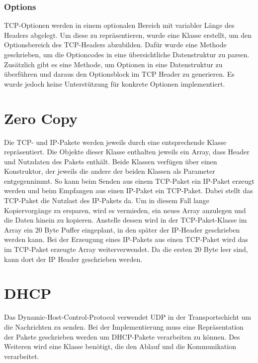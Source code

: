 \subsubsection{Options}
TCP-Optionen werden in einem optionalen Bereich mit variabler Länge des Headers abgelegt. Um diese zu repräsentieren, wurde eine Klasse erstellt, um den Optionsbereich des TCP-Headers abzubilden. Dafür wurde eine Methode geschrieben, um die Optioncodes in eine übersichtliche Datenstruktur zu parsen. Zusätzlich gibt es eine Methode, um Optionen in eine Datenstruktur zu überführen und daraus den Optionsblock im TCP Header zu generieren. Es wurde jedoch keine Unterstützung für konkrete Optionen implementiert.



\section{Zero Copy}
Die TCP- und IP-Pakete werden jeweils durch eine entsprechende Klasse repräsentiert. Die Objekte dieser Klasse enthalten jeweils ein Array, dass Header und Nutzdaten des Pakets enthält. Beide Klassen verfügen über einen Konstruktor, der jeweils die andere der beiden Klassen als Parameter entgegennimmt. So kann beim Senden aus einem TCP-Paket ein IP-Paket erzeugt werden und beim Empfangen aus einen IP-Paket ein TCP-Paket. Dabei stellt das TCP-Paket die Nutzlast des IP-Pakets da. Um in diesem Fall lange Kopiervorgänge zu ersparen, wird es vermieden, ein neues Array anzulegen und die Daten hinein zu kopieren. Anstelle dessen wird in der TCP-Paket-Klasse im Array ein 20 Byte Puffer eingeplant, in den später der IP-Header geschrieben werden kann. Bei der Erzeugung eines IP-Pakets aus einen TCP-Paket wird das im TCP-Paket erzeugte Array weiterverwendet. Da die ersten 20 Byte leer sind, kann dort der IP Header geschrieben werden.


\section{DHCP}
Das Dynamic-Host-Control-Protocol verwendet UDP in der Transportschicht um die Nachrichten zu senden. Bei der Implementierung muss eine Repräsentation der Pakete geschrieben werden um DHCP-Pakete verarbeiten zu können. Des Weiteren wird eine Klasse benötigt, die den Ablauf und die Kommunikation verarbeitet. 

